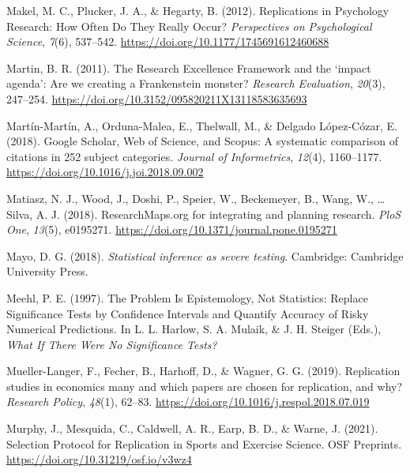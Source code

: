 \documentclass[
  english,
  man,floatsintext]{apa6}
\newlength{\cslhangindent}
\newlength{\cslentryspacingunit} %
\newenvironment{CSLReferences}[2] %
 {%
  \setlength{\parindent}{0pt}
  \ifodd #1
  \let\oldpar\par
  \def\par{\hangindent=\cslhangindent\oldpar}
  \fi
  \setlength{\parskip}{#2\cslentryspacingunit}
 }%
 {}
\begin{document}
\begin{CSLReferences}{1}{0}
\leavevmode{}%
Makel, M. C., Plucker, J. A., \& Hegarty, B. (2012). Replications in {Psychology Research}: {How Often Do They Really Occur}? \emph{Perspectives on Psychological Science}, \emph{7}(6), 537--542. \url{https://doi.org/10.1177/1745691612460688}

\leavevmode{}%
Martin, B. R. (2011). The {Research Excellence Framework} and the {`impact agenda'}: Are we creating a {Frankenstein} monster? \emph{Research Evaluation}, \emph{20}(3), 247--254. \url{https://doi.org/10.3152/095820211X13118583635693}

\leavevmode{}%
Martín-Martín, A., Orduna-Malea, E., Thelwall, M., \& Delgado López-Cózar, E. (2018). Google {Scholar}, {Web} of {Science}, and {Scopus}: {A} systematic comparison of citations in 252 subject categories. \emph{Journal of Informetrics}, \emph{12}(4), 1160--1177. \url{https://doi.org/10.1016/j.joi.2018.09.002}

\leavevmode{}%
Matiasz, N. J., Wood, J., Doshi, P., Speier, W., Beckemeyer, B., Wang, W., \ldots{} Silva, A. J. (2018). {ResearchMaps}.org for integrating and planning research. \emph{PloS One}, \emph{13}(5), e0195271. \url{https://doi.org/10.1371/journal.pone.0195271}

\leavevmode{}%
Mayo, D. G. (2018). \emph{Statistical inference as severe testing}. {Cambridge: Cambridge University Press}.

\leavevmode{}%
Meehl, P. E. (1997). The {Problem Is Epistemology}, {Not Statistics}: {Replace Significance Tests} by {Confidence Intervals} and {Quantify Accuracy} of {Risky Numerical Predictions}. In L. L. Harlow, S. A. Mulaik, \& J. H. Steiger (Eds.), \emph{What {If There Were No Significance Tests}?}

\leavevmode{}%
Mueller-Langer, F., Fecher, B., Harhoff, D., \& Wagner, G. G. (2019). Replication studies in economics many and which papers are chosen for replication, and why? \emph{Research Policy}, \emph{48}(1), 62--83. \url{https://doi.org/10.1016/j.respol.2018.07.019}

\leavevmode{}%
Murphy, J., Mesquida, C., Caldwell, A. R., Earp, B. D., \& Warne, J. (2021). Selection {Protocol} for {Replication} in {Sports} and {Exercise Science}. {OSF Preprints}. \url{https://doi.org/10.31219/osf.io/v3wz4}


\end{CSLReferences}
\end{document}

